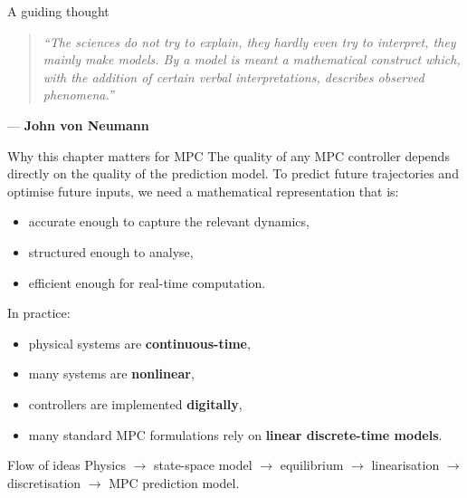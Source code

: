 \documentclass[aspectratio=169,10pt]{beamer}
\begin{document}
\begin{frame}{A guiding thought}
\begin{quote}
\itshape
``The sciences do not try to explain, they hardly even try to interpret,
they mainly make models.  By a model is meant a mathematical construct
which, with the addition of certain verbal interpretations, describes
observed phenomena.''
\end{quote}
\hfill --- \textbf{John von Neumann}
\end{frame}

\begin{frame}{Why this chapter matters for MPC}
The quality of any MPC controller depends directly on the quality of the
prediction model.  To predict future trajectories and optimise future
inputs, we need a mathematical representation that is:
\begin{itemize}
  \item accurate enough to capture the relevant dynamics,
  \item structured enough to analyse,
  \item efficient enough for real-time computation.
\end{itemize}

In practice:
\begin{itemize}
  \item physical systems are \textbf{continuous-time},
  \item many systems are \textbf{nonlinear},
  \item controllers are implemented \textbf{digitally},
  \item many standard MPC formulations rely on \textbf{linear discrete-time models}.
\end{itemize}

\begin{notebox}{Flow of ideas}
Physics $\rightarrow$ state-space model $\rightarrow$ equilibrium
$\rightarrow$ linearisation $\rightarrow$ discretisation
$\rightarrow$ MPC prediction model.
\end{notebox}
\end{frame}
\end{document}
